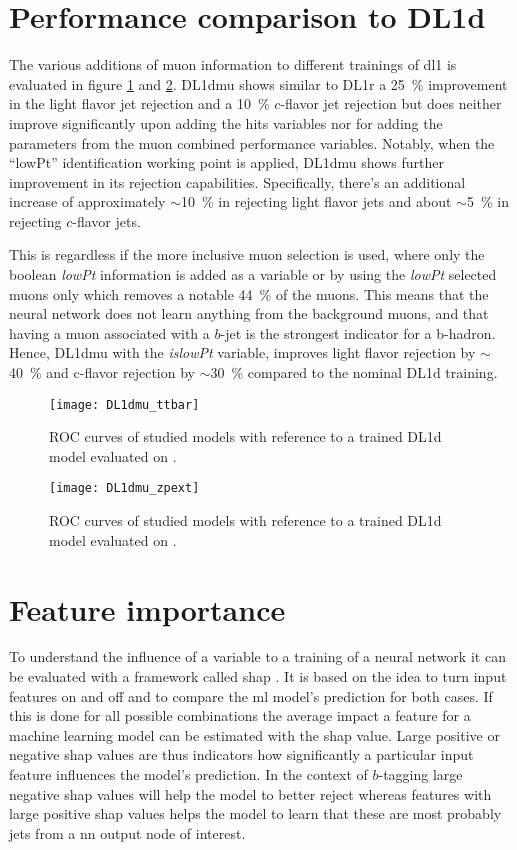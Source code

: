 \section{Performance comparison to DL1d}
The various additions of muon information to different trainings of \ac{dl1} is evaluated in figure \ref{fig:DL1dmu_ttbar} and \ref{fig:DL1dmu_zpext}. DL1dmu shows similar to DL1r a \qty{25}{\percent} improvement in the light flavor jet rejection and a \qty{10}{\percent} $c$-flavor jet rejection but does neither improve significantly upon adding the hits variables nor for adding the parameters from the muon combined performance variables. Notably, when the ``lowPt'' identification working point is applied, DL1dmu shows further improvement in its rejection capabilities. Specifically, there's an additional increase of approximately $\sim$\qty{10}{\percent} in rejecting light flavor jets and about $\sim$\SI{5}{\percent} in rejecting $c$-flavor jets.

This is regardless if the more inclusive muon selection is used, where only the boolean \textit{lowPt} information is added as a variable or by using the \textit{lowPt} selected muons only which removes a notable \qty{44}{\percent} of the muons. This means that the neural network does not learn anything from the background muons, and that having a muon associated with a $b$-jet is the strongest indicator for a b-hadron. Hence, DL1dmu with the \textit{islowPt} variable, improves light flavor rejection by $\sim$\qty{40}{\percent} and c-flavor rejection by $\sim$\qty{30}{\percent} compared to the nominal DL1d training.

\begin{figure}[]
  \centering
  \texttt{[image: DL1dmu\_ttbar]}
  \caption{ROC curves of studied models with reference to a trained DL1d model evaluated on \ttbar.}
  \label{fig:DL1dmu_ttbar}
\end{figure}
\begin{figure}[]
  \centering
  \texttt{[image: DL1dmu\_zpext]}
  \caption{ROC curves of studied models with reference to a trained DL1d model evaluated on \Zprime.}
  \label{fig:DL1dmu_zpext}
\end{figure}

\section{Feature importance}
To understand the influence of a variable to a training of a neural network it can be evaluated with a framework called \ac{shap} \citep{shap,NIPS2017_7062}. It is based on the idea to turn input features on and off and to compare the \ac{ml} model's prediction for both cases. If this is done for all possible combinations the average impact a feature for a machine learning model can be estimated with the \ac{shap} value. Large positive or negative \ac{shap} values are thus indicators how significantly a particular input feature influences the model's prediction. In the context of $b$-tagging large negative \ac{shap} values will help the model to better reject whereas features with large positive \ac{shap} values helps the model to learn that these are most probably jets from a \ac{nn} output node of interest.

